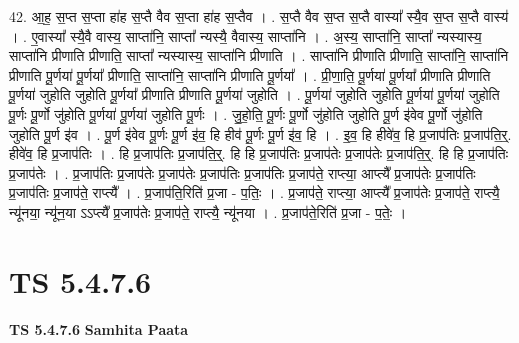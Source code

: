 \documentclass[17pt]{extarticle}
\begin{document}
42. आ॒ह॒ स॒प्त स॒प्ता हा॑ह स॒प्तै वैव स॒प्ता हा॑ह स॒प्तैव । . स॒प्तै वैव स॒प्त स॒प्तै वास्या᳚ स्यै॒व स॒प्त स॒प्तै वास्य॑ । . ए॒वास्या᳚ स्यै॒वै वास्य॒ साप्ता॑नि॒ साप्ता᳚ न्यस्यै॒ वैवास्य॒ साप्ता॑नि । . अ॒स्य॒ साप्ता॑नि॒ साप्ता᳚ न्यस्यास्य॒ साप्ता॑नि प्रीणाति प्रीणाति॒ साप्ता᳚ न्यस्यास्य॒ साप्ता॑नि प्रीणाति । . साप्ता॑नि प्रीणाति प्रीणाति॒ साप्ता॑नि॒ साप्ता॑नि प्रीणाति पू॒र्णया॑ पू॒र्णया᳚ प्रीणाति॒ साप्ता॑नि॒ साप्ता॑नि प्रीणाति पू॒र्णया᳚ । . प्री॒णा॒ति॒ पू॒र्णया॑ पू॒र्णया᳚ प्रीणाति प्रीणाति पू॒र्णया॑ जुहोति जुहोति पू॒र्णया᳚ प्रीणाति प्रीणाति पू॒र्णया॑ जुहोति । . पू॒र्णया॑ जुहोति जुहोति पू॒र्णया॑ पू॒र्णया॑ जुहोति पू॒र्णः पू॒र्णो जु॑होति पू॒र्णया॑ पू॒र्णया॑ जुहोति पू॒र्णः । . जु॒हो॒ति॒ पू॒र्णः पू॒र्णो जु॑होति जुहोति पू॒र्ण इ॑वेव पू॒र्णो जु॑होति जुहोति पू॒र्ण इ॑व । . पू॒र्ण इ॑वेव पू॒र्णः पू॒र्ण इ॑व॒ हि हीव॑ पू॒र्णः पू॒र्ण इ॑व॒ हि । . इ॒व॒ हि हीवे॑व॒ हि प्र॒जाप॑तिः प्र॒जाप॑ति॒र्॒. हीवे॑व॒ हि प्र॒जाप॑तिः । . हि प्र॒जाप॑तिः प्र॒जाप॑ति॒र्॒. हि हि प्र॒जाप॑तिः प्र॒जाप॑तेः प्र॒जाप॑तेः प्र॒जाप॑ति॒र्॒. हि हि प्र॒जाप॑तिः प्र॒जाप॑तेः । . प्र॒जाप॑तिः प्र॒जाप॑तेः प्र॒जाप॑तेः प्र॒जाप॑तिः प्र॒जाप॑तिः प्र॒जाप॑ते॒ राप्त्या॒ आप्त्यै᳚ प्र॒जाप॑तेः प्र॒जाप॑तिः प्र॒जाप॑तिः प्र॒जाप॑ते॒ राप्त्यै᳚ । . प्र॒जाप॑ति॒रिति॑ प्र॒जा - प॒तिः॒ । . प्र॒जाप॑ते॒ राप्त्या॒ आप्त्यै᳚ प्र॒जाप॑तेः प्र॒जाप॑ते॒ राप्त्यै॒ न्यू॑नया॒ न्यू॑न॒या ऽऽप्त्यै᳚ प्र॒जाप॑तेः प्र॒जाप॑ते॒ राप्त्यै॒ न्यू॑नया । . प्र॒जाप॑ते॒रिति॑ प्र॒जा - प॒तेः॒ । \newline
\pagebreak
{}

\section{ TS 5.4.7.6 }

\textbf{TS 5.4.7.6 } \newline
\textbf{Samhita Paata} \newline
\end{document}
